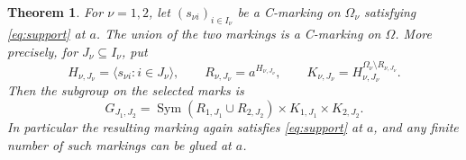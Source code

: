 \documentclass[a4paper,11pt]{article}
\newcommand{\Sym}{\operatorname{Sym}}
\newcommand{\gen}[1]{\langle #1\rangle}
\newtheorem{theorem}{Theorem}\newtheorem{lemma}[theorem]{Lemma}\newtheorem{corollary}[theorem]{Corollary}
\begin{document}
\begin{theorem}\label{thm:gluing}
For $\nu=1,2$, let $(s_{\nu i})_{i\in I_\nu}$ be a C-marking on
$\Omega_\nu$ satisfying \eqref{eq:support} at $a$.
The union of the two markings is a C-marking on $\Omega$.
More precisely, for $J_\nu\subseteq I_\nu$, put
\[
 H_{\nu,J_\nu}=\gen{s_{\nu i}:i\in J_\nu},\qquad
 R_{\nu,J_\nu}=a^{H_{\nu,J_\nu}},\qquad
 K_{\nu,J_\nu}=H_{\nu,J_\nu}^{\Omega_\nu\setminus R_{\nu,J_\nu}}.
\]
Then the subgroup on the selected marks is
\begin{equation}\label{eq:joined}
 G_{J_1,J_2}
 =\Sym(R_{1,J_1}\cup R_{2,J_2})
       \times K_{1,J_1}\times K_{2,J_2}.
\end{equation}
In particular the resulting marking again satisfies \eqref{eq:support}
at $a$, and any finite number of such markings can be glued at $a$.
\end{theorem}
\end{document}
